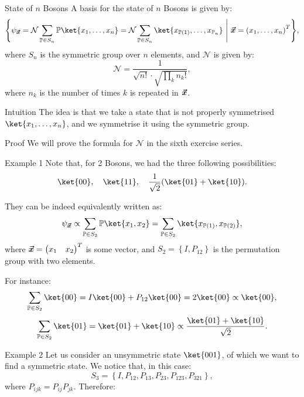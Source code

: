 \documentclass[a4paper]{article}
\begin{document}
\begin{parag}{State of $n$ Bosons}
    A basis for the state of $n$ Bosons is given by: 
    \[\left\{\psi_{\bvec{x}} = \mathcal{N} \sum_{\mathbb{P} \in S_n} \mathbb{P} \ket{x_1, \ldots, x_n} = \mathcal{N} \sum_{\mathbb{P} \in S_n} \ket{x_{\mathbb{P}\left(1\right)}, \ldots, x_{\mathbb{P}_n}} \suchthat \bvec{x} = \left(x_1, \ldots, x_n\right)^T\right\},\]
    where $S_n$ is the symmetric group over $n$ elements, and $\mathcal{N}$ is given by:
    \[\mathcal{N} = \frac{1}{\sqrt{n!} \cdot \sqrt{\prod_{k} n_k!}},\]
    where $n_k$ is the number of times $k$ is repeated in $\bm{\protect\vec{x}}$.

    \begin{subparag}{Intuition}
        The idea is that we take a state that is not properly symmetrised $\ket{x_1, \ldots, x_n}$, and we symmetrise it using the symmetric group.
    \end{subparag}

    \begin{subparag}{Proof}
        We will prove the formula for $\mathcal{N}$ in the sixth exercise series.
    \end{subparag}

    \begin{subparag}{Example 1}
        Note that, for 2 Bosons, we had the three following possibilities: 
        \[\ket{00}, \mathspace \ket{11}, \mathspace \frac{1}{\sqrt{2}}\left(\ket{01} + \ket{10}\right).\]
        
        They can be indeed equivalently written as: 
        \[\psi_{\bvec{x}} \propto \sum_{\mathbb{P} \in S_2} \mathbb{P} \ket{x_1, x_2} = \sum_{\mathbb{P} \in S_2} \ket{x_{\mathbb{P}\left(1\right)}, x_{\mathbb{P}\left(2\right)}},\]
        where $\bm{\protect\vec{x}} = \begin{pmatrix} x_1 & x_2 \end{pmatrix}^T$ is some vector, and $S_2 = \left\{I, P_{12}\right\}$ is the permutation group with two elements.

        For instance: 
        \[\sum_{\mathbb{P} \in S_2} \ket{00} = I \ket{00} + P_{12}\ket{00} = 2 \ket{00} \propto \ket{00},\] 
        \[\sum_{\mathbb{P} \in S_2} \ket{01} = \ket{01} + \ket{10} \propto \frac{\ket{01} + \ket{10}}{\sqrt{2}}.\]
    \end{subparag}

    \begin{subparag}{Example 2}
        Let us consider an unsymmetric state $\ket{001}$, of which we want to find a symmetric state. We notice that, in this case: 
        \[S_3 = \left\{I, P_{12}, P_{13}, P_{23}, P_{123}, P_{321}\right\},\]
        where $P_{ijk} = P_{ij} P_{jk}$. Therefore: 
    \end{subparag}
\end{parag}
\end{document}
